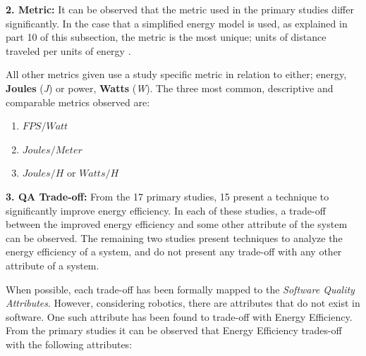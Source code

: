 \vspace{5mm}

\noindent\textbf{2. Metric:} %
It can be observed that the metric used in the primary studies differ significantly.
In the case that a simplified energy model is used, as explained in part 10 of this subsection, the metric is the most unique;
units of distance traveled per units of energy \cite{mei2006mobile_exploration, patel2012exploration_strategy}.

All other metrics given use a study specific metric in relation to either; energy, \textbf{Joules} (\textit{J}) or power, \textbf{Watts} (\textit{W}).
The three most common, descriptive and comparable metrics observed are:
\begin{enumerate}
    \item $FPS / Watt$ \cite{cheng2018FPGA_image_recognition}
    \item $Joules / Meter$ \cite{licea2013wireless_comms}
    \item $Joules / H$ or $Watts / H$ \cite{kim2016firefighting_robot,barili1995efficient_motion}
\end{enumerate}

\vspace{5mm}

\noindent\textbf{3. QA Trade-off:}
From the 17 primary studies, 15 present a technique to significantly improve energy efficiency.
In each of these studies, a trade-off between the improved energy efficiency and some other attribute of the system can be observed. 
The remaining two studies present techniques to analyze the energy efficiency of a system, and do not present any trade-off with any other
attribute of a system.

\vspace{2mm}

When possible, each trade-off has been formally mapped to the \textit{Software Quality Attributes\cite{iso2011quality_attributes}}.
However, considering robotics, there are attributes that do not exist in software.
One such attribute has been found to trade-off with Energy Efficiency. 
From the primary studies it can be observed that Energy Efficiency trades-off with the following attributes:


